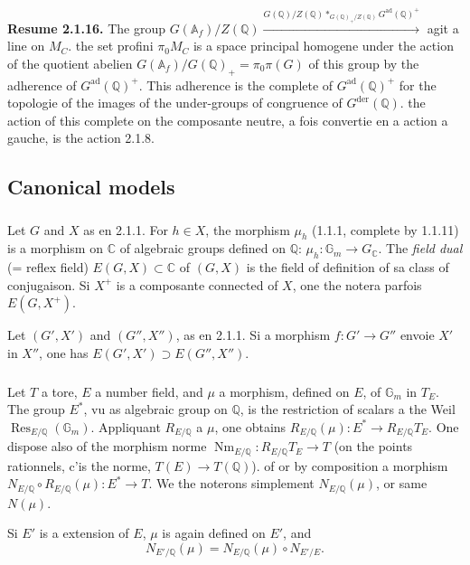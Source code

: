 \documentclass[12pt,a4paper]{article}
\theoremstyle{plain}
\theoremstyle{definition}
\theoremstyle{remark}
\DeclareMathOperator{\Res}{Res}
\DeclareMathOperator{\Nm}{Nm}
\newcommand{\QQ}{\mathbb{Q}}
\newcommand{\CC}{\mathbb{C}}
\newcommand{\Af}{\mathbb{A}_f}
\newcommand{\Gm}{\mathbb{G}}
\begin{document}
\textbf{Resume 2.1.16.} The group $G(\Af)/Z(\QQ) \xrightarrow{G(\QQ)/Z(\QQ) *_{G(\QQ)_+/Z(\QQ)} G^{\text{ad}}(\QQ)^+}$ agit a line on $M_C$. the set profini $\pi_0 M_C$ is a space principal homogene under the action of the quotient abelien $G(\Af)/G(\QQ)_+ = \pi_0\pi(G)$ of this group by the adherence of $G^{\text{ad}}(\QQ)^+$. This adherence is the complete of $G^{\text{ad}}(\QQ)^+$ for the topologie of the images of the under-groups of congruence of $G^{\text{der}}(\QQ)$. the action of this complete on the composante neutre, a fois convertie en a action a gauche, is the action 2.1.8.

\subsection{Canonical models}

\subsubsection{}

Let $G$ and $X$ as en 2.1.1. For $h \in X$, the morphism $\mu_h$ (1.1.1, complete by 1.1.11) is a morphism on $\CC$ of algebraic groups defined on $\QQ$: $\mu_h:\Gm_m \to G_{\CC}$. The \textit{field dual} (= reflex field) $E(G,X) \subset \CC$ of $(G,X)$ is the field of definition of sa class of conjugaison. Si $X^+$ is a composante connected of $X$, one the notera parfois $E(G,X^+)$.

Let $(G',X')$ and $(G'',X'')$, as en 2.1.1. Si a morphism $f:G' \to G''$ envoie $X'$ in $X''$, one has $E(G',X') \supset E(G'',X'')$.

\subsubsection{}

Let $T$ a tore, $E$ a number field, and $\mu$ a morphism, defined on $E$, of $\Gm_m$ in $T_E$. The group $E^*$, vu as algebraic group on $\QQ$, is the restriction of scalars a the Weil $\Res_{E/\QQ}(\Gm_m)$. Appliquant $R_{E/\QQ}$ a $\mu$, one obtains $R_{E/\QQ}(\mu): E^* \to R_{E/\QQ}T_E$. One dispose also of the morphism norme $\Nm_{E/\QQ}: R_{E/\QQ}T_E \to T$ (on the points rationnels, c'is the norme, $T(E) \to T(\QQ)$). of or by composition a morphism $N_{E/\QQ} \circ R_{E/\QQ}(\mu): E^* \to T$. We the noterons simplement $N_{E/\QQ}(\mu)$, or same $N(\mu)$.

Si $E'$ is a extension of $E$, $\mu$ is again defined on $E'$, and
\begin{equation}\label{eq:2.2.2.1}
N_{E'/\QQ}(\mu) = N_{E/\QQ}(\mu) \circ N_{E'/E}.
\end{equation}
\end{document}

